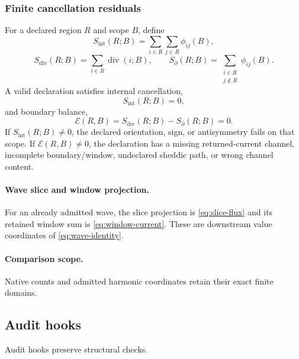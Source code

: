 \subsubsection{Finite cancellation residuals}
\label{subsec:afc-flux-stokes-audit}
For a declared region \(R\) and scope \(B\), define
\begin{equation}
S_{\mathrm{int}}(R;B)
=
\sum_{i\in R}\sum_{j\in R}\phi_{ij}(B),
\label{eq:stokes-audit-internal}
\end{equation}
\begin{equation}
S_{\mathrm{div}}(R;B)
=
\sum_{i\in R}\operatorname{div}(i;B),
\qquad
S_{\partial}(R;B)
=
\sum_{\substack{i\in R\\j\notin R}}\phi_{ij}(B).
\label{eq:stokes-audit-sums}
\end{equation}
A valid declaration satisfies internal cancellation,
\begin{equation}
S_{\mathrm{int}}(R;B)=0,
\label{eq:stokes-audit-internal-zero}
\end{equation}
and boundary balance,
\begin{equation}
\mathcal E(R,B)
=
S_{\mathrm{div}}(R;B)-S_{\partial}(R;B)=0.
\label{eq:stokes-audit-residual}
\end{equation}
If \(S_{\mathrm{int}}(R;B)\ne0\), the declared orientation, sign, or antisymmetry fails on that scope. If \(\mathcal E(R,B)\ne0\), the declaration has a missing returned-current channel, incomplete boundary/window, undeclared sheddic path, or wrong channel content.

\paragraph{Wave slice and window projection.}
For an already admitted wave, the slice projection is \eqref{eq:slice-flux}
and its retained window sum is \eqref{eq:window-current}. These are downstream
value coordinates of \eqref{eq:wave-identity}.
\paragraph{Comparison scope.}\label{subsec:external-comparison-quarantine}
Native counts and admitted harmonic coordinates retain their exact finite
domains.

\subsection{Audit hooks}
\label{sec:audit-hooks}
Audit hooks preserve structural checks.


